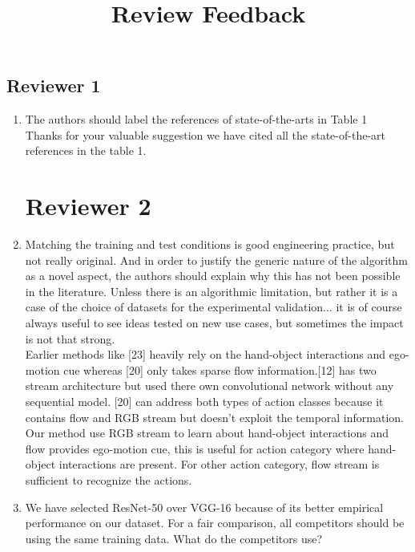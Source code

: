 \documentclass{article}
\begin{document}
\title{Review Feedback}
\maketitle
\begin{center}
\section*{Reviewer 1}
\end{center}

\begin{enumerate}
\item The authors should label the references of state-of-the-arts in Table 1 \\

Thanks for your valuable suggestion we have cited all the state-of-the-art references in the table 1.

\begin{center}
\section*{Reviewer 2}
\end{center}


\item Matching the training and test conditions is good engineering practice, but not really original. And in order to justify the generic nature of the algorithm as a novel aspect, the authors should explain why this has not been possible in the literature. Unless there is an algorithmic limitation, but rather it is a case of the choice of datasets for the experimental validation... it is of course always useful to see ideas tested on new use cases, but sometimes the impact is not that strong. \\

 Earlier methods like [23] heavily rely on the hand-object interactions and ego-motion cue whereas [20] only takes sparse flow information.[12] has two stream architecture but used there own convolutional network without any sequential model. [20] can address both types of action classes because it contains flow and RGB stream but doesn't exploit the temporal information. Our method use RGB stream to learn about hand-object interactions and flow provides ego-motion cue, this is useful for action category where hand-object interactions are present. For other action category, flow stream is sufficient to recognize the actions.

\item We have selected ResNet-50 over VGG-16 because of its better empirical performance on our dataset. For a fair comparison, all competitors should be using the same training data. What do the competitors use? \\


\end{enumerate}
\end{document}
